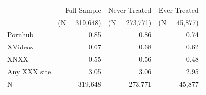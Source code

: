 \begin{tabular}{lrrr}
\toprule
 & Full Sample & Never-Treated & Ever-Treated \\
 & (N = 319,648) & (N = 273,771) & (N =  45,877) \\
\midrule
Pornhub & 0.85 & 0.86 & 0.74 \\
XVideos & 0.67 & 0.68 & 0.62 \\
XNXX & 0.55 & 0.56 & 0.48 \\
Any XXX site & 3.05 & 3.06 & 2.95 \\
\midrule
N & 319,648 & 273,771 &  45,877 \\
\bottomrule
\end{tabular}
